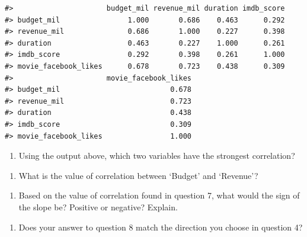 \documentclass[
]{report}
\providecommand{\tightlist}{%
  \setlength{\itemsep}{0pt}\setlength{\parskip}{0pt}}
\begin{document}
\begin{verbatim}
#>                      budget_mil revenue_mil duration imdb_score
#> budget_mil                1.000       0.686    0.463      0.292
#> revenue_mil               0.686       1.000    0.227      0.398
#> duration                  0.463       0.227    1.000      0.261
#> imdb_score                0.292       0.398    0.261      1.000
#> movie_facebook_likes      0.678       0.723    0.438      0.309
#>                      movie_facebook_likes
#> budget_mil                          0.678
#> revenue_mil                         0.723
#> duration                            0.438
#> imdb_score                          0.309
#> movie_facebook_likes                1.000
\end{verbatim}

\begin{enumerate}
\def\labelenumi{\arabic{enumi}.}
\setcounter{enumi}{5}
\tightlist
\item
  Using the output above, which two variables have the strongest correlation?
\end{enumerate}

\vspace{0.3in}

\begin{enumerate}
\def\labelenumi{\arabic{enumi}.}
\setcounter{enumi}{6}
\tightlist
\item
  What is the value of correlation between `Budget' and `Revenue'?
\end{enumerate}

\vspace{0.3in}

\begin{enumerate}
\def\labelenumi{\arabic{enumi}.}
\setcounter{enumi}{7}
\tightlist
\item
  Based on the value of correlation found in question 7, what would the sign of the slope be? Positive or negative? Explain.
\end{enumerate}

\vspace{0.5in}

\begin{enumerate}
\def\labelenumi{\arabic{enumi}.}
\setcounter{enumi}{8}
\tightlist
\item
  Does your answer to question 8 match the direction you choose in question 4?
\end{enumerate}

\vspace{0.2in}
\end{document}
